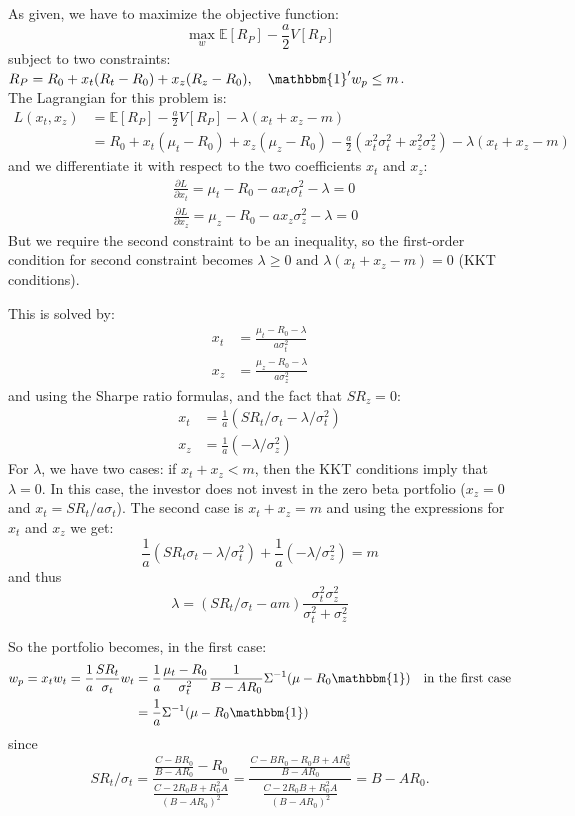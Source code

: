 \documentclass[10pt]{article}
\newcommand{\Ebb}{\mathbb{E}}
\newenvironment{exercise}[2][Exercise]{\begin{trivlist}
  \item[\hskip \labelsep {\bfseries #1}\hskip \labelsep {\bfseries #2.}]}{\end{trivlist}}
\begin{document}
\begin{exercise}{1}
\begin{itemize}
    As given, we have to maximize the objective function: $$ \max_w \Ebb[R_P] - \frac{a}{2}V[R_P]$$ subject to two constraints: $R_P = R_0 + x_t(R_t - R_0)  + x_z(R_z-R_0), \quad \mathbbm{1}'w_p \leq m$. 
    \\
    The Lagrangian for this problem is: \begin{align*}
      L(x_t,x_z) &= \Ebb[R_P] - \frac{a}{2}V[R_P] - \lambda(x_t+x_z -m)\\
      &= R_0 +x_t(\mu_t-R_0) + x_z(\mu_z-R_0) - \frac{a}{2}(x_t^2\sigma_t^2+x_z^2\sigma_z^2) - \lambda(x_t+x_z-m)
    \end{align*} and we differentiate it with respect to the two coefficients $x_t$ and $x_z$: 
    \begin{align*}
      &\frac{\partial L}{\partial x_t} = \mu_t-R_0 -ax_t\sigma_t^2-\lambda = 0\\
      &\frac{\partial L}{\partial x_z} = \mu_z-R_0 -ax_z\sigma_z^2-\lambda = 0
    \end{align*}
    But we require the second constraint to be an inequality, so the first-order condition for second constraint becomes $ \lambda\geq 0 \text{ and } \lambda(x_t+x_z-m) = 0$ (KKT conditions). 

    This is solved by: 
    \begin{align*}
      x_t &= \frac{\mu_t -R_0 -\lambda}{a\sigma_t^2}\\
      x_z &= \frac{\mu_z -R_0 -\lambda}{a\sigma_z^2}
    \end{align*} and using the Sharpe ratio formulas, and the fact that $SR_z = 0$:
    \begin{align*}
      x_t &= \frac{1}{a}(SR_t/\sigma_t - \lambda/\sigma_t^2)\\
      x_z &= \frac{1}{a}(-\lambda/\sigma_z^2)
    \end{align*}
    For $\lambda$, we have two cases: if $x_t+x_z < m$, then the KKT conditions imply that $\lambda = 0$. In this case, the investor does not invest in the zero beta portfolio ($x_z = 0$ and $x_t = SR_t/{a\sigma_t}$). The second case is $x_t+x_z = m$ and using the expressions for $x_t$ and $x_z$ we get:
    $$ \frac{1}{a}(SR_t\sigma_t - \lambda/\sigma_t^2) + \frac{1}{a}(-\lambda/\sigma_z^2) = m$$
    and thus $$ \lambda = (SR_t/\sigma_t -am)\frac{\sigma_t^2\sigma_z^2}{\sigma_t^2+\sigma_z^2}$$

    So the portfolio becomes, in the first case: 
    \begin{align*}
      w_p = x_tw_t = \frac{1}{a}\frac{SR_t}{\sigma_t} w_t &= \frac{1}{a}\frac{\mu_t-R_0}{\sigma_t^2}\frac{1}{B-AR_0}\Sigma^{-1}(\mu-R_0\mathbbm{1}) \quad \text{in the first case} \\
      &= \frac{1}{a}\Sigma^{-1}(\mu-R_0\mathbbm{1})
    \end{align*} since $$SR_t/\sigma_t = \frac{\frac{C-BR_0}{B-AR_0}- R_0}{\frac{C-2R_0B+R_0^2A}{(B-AR_0)^2}} = \frac{\frac{C-BR_0-R_0B+AR_0^2}{B-AR_0}}{\frac{C-2R_0B+R_0^2A}{(B-AR_0)^2}} = B-AR_0.$$


\end{itemize}
\end{exercise}
\end{document}
